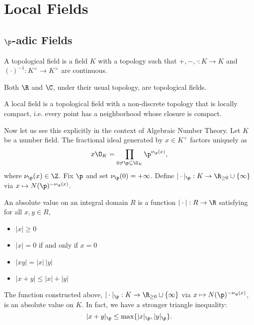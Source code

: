 
\section{Local Fields}
\subsection{$\p$-adic Fields}


\begin{dfn}
A topological field is a field $K$ with a topology such that $+,-,\cdot: K \to K$ and $(\cdot)^{-1}: K^\times \to K^\times$ are continuous. 
\end{dfn}

\begin{ex}
Both $\R$ and $\C$, under their usual topology, are topological fields. \xqed
\end{ex}

\begin{dfn}
A local field is a topological field with a non-discrete topology that is locally compact, i.e. every point has a neighborhood whose closure is compact. 
\end{dfn}

Now let us see this explicitly in the context of Algebraic Number Theory. Let $K$ be a number field. The fractional ideal generated by $x \in K^\times$ factors uniquely as
	\[
	x \O_K= \prod_{0 \neq \p \subseteq \O_K} \p^{\nu_\p(x)},
	\]
where $\nu_\p(x) \in \Z$. Fix $\p$ and set $\nu_\p(0)=+\infty$. Define $|\cdot|_\p: K \to \R_{\geq 0} \cup \{\infty\}$ via $x \mapsto N(\p)^{-\nu_\p(x)}$.

\begin{dfn}
An absolute value on an integral domain $R$ is a function $|\cdot|: R \to \R$ satisfying for all $x,y \in R$,
\begin{itemize}
\item $|x| \geq 0$
\item $|x|=0$ if and only if $x=0$
\item $|xy|= |x|\,|y|$
\item $|x+y| \leq |x|+|y|$
\end{itemize}
\end{dfn}

\begin{ex}
The function constructed above, $|\cdot|_\p: K \to \R_{\geq 0} \cup \{\infty\}$ via $x \mapsto N(\p)^{-\nu_\p(x)}$, is an absolute value on $K$. In fact, we have a stronger triangle inequality:
	\[
	|x+y|_\p \leq \max\{|x|_\p, |y|_\p\}.
	\]
\end{ex}

